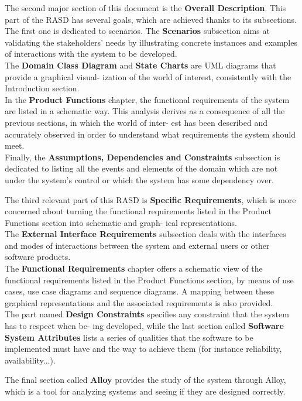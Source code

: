 The second major section of this document is the \textbf{Overall Description}. This part of the RASD has
several goals, which are achieved thanks to its subsections. \\
The first one is dedicated to scenarios. The \textbf{Scenarios} subsection aims at validating the stakeholders’
needs by illustrating concrete instances and examples of interactions with the system to be developed. \\
The \textbf{Domain Class Diagram} and \textbf{State Charts} are UML diagrams that provide a graphical visual-
ization of the world of interest, consistently with the Introduction section. \\
In the \textbf{Product Functions} chapter, the functional requirements of the system are listed in a schematic
way. This analysis derives as a consequence of all the previous sections, in which the world of inter-
est has been described and accurately observed in order to understand what requirements the system
should meet. \\
Finally, the \textbf{Assumptions, Dependencies and Constraints} subsection is dedicated to listing all the
events and elements of the domain which are not under the system’s control or which the system has
some dependency over.

The third relevant part of this RASD is \textbf{Specific Requirements}, which is more concerned about
turning the functional requirements listed in the Product Functions section into schematic and graph-
ical representations. \\
The \textbf{External Interface Requirements} subsection deals with the interfaces and modes of interactions
between the system and external users or other software products. \\
The \textbf{Functional Requirements} chapter offers a schematic view of the functional requirements listed
in the Product Functions section, by means of use cases, use case diagrams and sequence diagrams.
A mapping between these graphical representations and the associated requirements is also provided. \\
The part named \textbf{Design Constraints} specifies any constraint that the system has to respect when be-
ing developed, while the last section called \textbf{Software System Attributes} lists a series of qualities
that the software to be implemented must have and the way to achieve them (for instance reliability,
availability...).

The final section called \textbf{Alloy} provides the study of the system through Alloy, which is a tool for
analyzing systems and seeing if they are designed correctly.